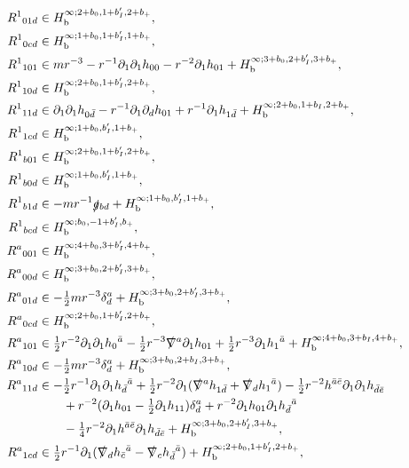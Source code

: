 \documentclass[reqno,11pt,letterpaper]{amsart}
\numberwithin{equation}{section}
\numberwithin{figure}{section}
\theoremstyle{definition}
\theoremstyle{remark}
\newcommand{\slg}{\slashed{g}{}}
\newcommand{\slnabla}{\slashed{\nabla}{}}
\newcommand{\pa}{\partial}
\newcommand{\bop}{{\mathrm{b}}}
\newcommand{\half}{\tfrac{1}{2}}
\newcommand{\Hb}{H_{\bop}}
\begin{document}
\begin{align}
  R^1{}_{0 1 d} &\in \Hb^{\infty;2+b_0,1+b'_I,2+b_+}, \nonumber\\
  R^1{}_{0 c d} &\in \Hb^{\infty;1+b_0,1+b'_I,1+b_+}, \nonumber\\
  R^1{}_{1 0 1} &\in m r^{-3}-r^{-1}\pa_1\pa_1 h_{0 0}-r^{-2}\pa_1 h_{0 1} + \Hb^{\infty;3+b_0,2+b'_I,3+b_+}, \nonumber\\
  R^1{}_{1 0 d} &\in \Hb^{\infty;2+b_0,1+b'_I,2+b_+}, \nonumber\\
  R^1{}_{1 1 d} &\in \pa_1\pa_1 h_{0\bar d}-r^{-1}\pa_1\pa_d h_{0 1}+r^{-1}\pa_1 h_{1\bar d} + \Hb^{\infty;2+b_0,1+b_I,2+b_+}, \nonumber\\
  R^1{}_{1 c d} &\in \Hb^{\infty;1+b_0,b'_I,1+b_+}, \nonumber\\
  R^1{}_{b 0 1} &\in \Hb^{\infty;2+b_0,1+b'_I,2+b_+}, \nonumber\\
  R^1{}_{b 0 d} &\in \Hb^{\infty;1+b_0,b'_I,1+b_+}, \nonumber\\
  R^1{}_{b 1 d} &\in -m r^{-1}\slg_{b d} + \Hb^{\infty;1+b_0,b'_I,1+b_+}, \nonumber\\
  R^1{}_{b c d} &\in \Hb^{\infty;b_0,-1+b'_I,b_+}, \nonumber\\
  R^a{}_{0 0 1} &\in \Hb^{\infty;4+b_0,3+b'_I,4+b_+}, \nonumber\\
  R^a{}_{0 0 d} &\in \Hb^{\infty;3+b_0,2+b'_I,3+b_+}, \nonumber\\
  R^a{}_{0 1 d} &\in -\half m r^{-3}\delta_d^a + \Hb^{\infty;3+b_0,2+b'_I,3+b_+}, \nonumber\\
  R^a{}_{0 c d} &\in \Hb^{\infty;2+b_0,1+b'_I,2+b_+}, \nonumber\\
  R^a{}_{1 0 1} &\in \half r^{-2}\pa_1\pa_1 h_0{}^{\bar a}-\half r^{-3}\slnabla^a\pa_1 h_{0 1} + \half r^{-3}\pa_1 h_1{}^{\bar a} + \Hb^{\infty;4+b_0,3+b_I,4+b_+}, \nonumber\\
  R^a{}_{1 0 d} &\in -\half m r^{-3}\delta_d^a + \Hb^{\infty;3+b_0,2+b_I,3+b_+}, \nonumber\\
  R^a{}_{1 1 d} &\in -\half r^{-1}\pa_1\pa_1 h_{\bar d}{}^{\bar a} + \half r^{-2}\pa_1(\slnabla^a h_{1\bar d}+\slnabla_d h_1{}^{\bar a}) - \half r^{-2}h^{\bar a\bar e}\pa_1\pa_1 h_{\bar d\bar e} \nonumber\\
    &\qquad +r^{-2}(\pa_1 h_{0 1}-\half\pa_1 h_{1 1})\delta_d^a + r^{-2}\pa_1 h_{0 1}\pa_1 h_{\bar d}{}^{\bar a} \nonumber\\
    &\qquad -\tfrac14 r^{-2}\pa_1 h^{\bar a\bar e}\pa_1 h_{\bar d\bar e} + \Hb^{\infty;3+b_0,2+b'_I,3+b_+}, \nonumber\\
  R^a{}_{1 c d} &\in \half r^{-1}\pa_1(\slnabla_d h_{\bar c}{}^{\bar a}-\slnabla_c h_{\bar d}{}^{\bar a}) + \Hb^{\infty;2+b_0,1+b'_I,2+b_+}, \nonumber\\

\end{align}
\end{document}
